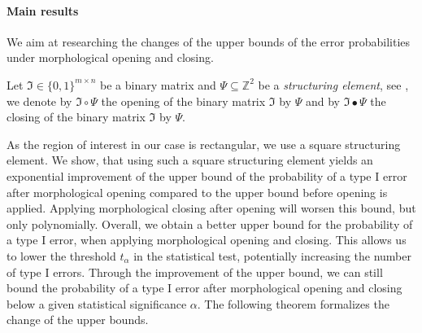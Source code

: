 \documentclass[a4paper,12pt]{article}
\theoremstyle{plain}
\theoremstyle{definition}
\begin{document}
\paragraph{Main results}

We aim at researching the changes of the upper bounds of the error probabilities under morphological opening and closing.

Let $\mathfrak{I} \in \{ 0, 1 \}^{m \times n}$ be a binary matrix and $\Psi \subseteq \mathbb{Z}^2$ be a \emph{structuring element}, see \cite{imageprocessing}, we denote by $\mathfrak{I} \circ \Psi$ the opening of the binary matrix $\mathfrak{I}$ by $\Psi$ and by $\mathfrak{I} \bullet \Psi$ the closing of the binary matrix $\mathfrak{I}$ by $\Psi$.

As the region of interest in our case is rectangular, we use a square structuring element. We show, that using such a square structuring element yields an exponential improvement of the upper bound of the probability of a type I error after morphological opening compared to the upper bound before opening is applied. Applying morphological closing after opening will worsen this bound, but only polynomially. Overall, we obtain a better upper bound for the probability of a type I error, when applying morphological opening and closing. This allows us to lower the threshold $t_\alpha$ in the statistical test, potentially increasing the number of type I errors. Through the improvement of the upper bound, we can still bound the probability of a type I error after morphological opening and closing below a given statistical significance $\alpha$. The following theorem formalizes the change of the upper bounds.
\end{document}
